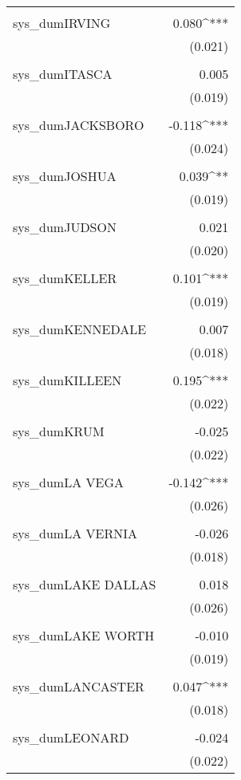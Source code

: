 \begin{table}[!htbp]
\begin{tabular}{@{\extracolsep{5pt}}lD{.}{.}{-3} }
  & \\ 
 sys\_dumIRVING & 0.080^{***} \\ 
  & (0.021) \\ 
  & \\ 
 sys\_dumITASCA & 0.005 \\ 
  & (0.019) \\ 
  & \\ 
 sys\_dumJACKSBORO & -0.118^{***} \\ 
  & (0.024) \\ 
  & \\ 
 sys\_dumJOSHUA & 0.039^{**} \\ 
  & (0.019) \\ 
  & \\ 
 sys\_dumJUDSON & 0.021 \\ 
  & (0.020) \\ 
  & \\ 
 sys\_dumKELLER & 0.101^{***} \\ 
  & (0.019) \\ 
  & \\ 
 sys\_dumKENNEDALE & 0.007 \\ 
  & (0.018) \\ 
  & \\ 
 sys\_dumKILLEEN & 0.195^{***} \\ 
  & (0.022) \\ 
  & \\ 
 sys\_dumKRUM & -0.025 \\ 
  & (0.022) \\ 
  & \\ 
 sys\_dumLA VEGA & -0.142^{***} \\ 
  & (0.026) \\ 
  & \\ 
 sys\_dumLA VERNIA & -0.026 \\ 
  & (0.018) \\ 
  & \\ 
 sys\_dumLAKE DALLAS & 0.018 \\ 
  & (0.026) \\ 
  & \\ 
 sys\_dumLAKE WORTH & -0.010 \\ 
  & (0.019) \\ 
  & \\ 
 sys\_dumLANCASTER & 0.047^{***} \\ 
  & (0.018) \\ 
  & \\ 
 sys\_dumLEONARD & -0.024 \\ 
  & (0.022) \\ 

\end{tabular}
\end{table}
